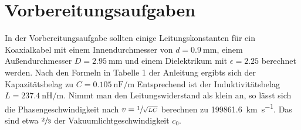 \section{Vorbereitungsaufgaben}
In der Vorbereitungsaufgabe sollten einige Leitungskonstanten für ein Koaxialkabel mit einem Innendurchmesser von $d = \SI{0.9}{\mm}$,
einem Außendurchmesser $D = \SI{2.95}{\mm}$  und einem Dielektrikum mit $\epsilon = \num{2.25}$ berechnet werden.
Nach den Formeln in Tabelle 1 der Anleitung\cite{v52} ergibts sich der Kapazitätsbelag zu $C = \SI{0.105}{\nano\farad \per \meter}$
Entsprechend ist der Induktivitätsbelag $ L = \SI{237.4}{\nano \henry \per \meter}$.
Nimmt man den Leitungswiderstand als klein an, so lässt sich die Phasengeschwindigkeit nach $v = \sfrac{1}{\sqrt{L C}}$ berechnen zu
\SI{199861.6}{\kilo\meter\per\second}. Das sind etwa $\sfrac{2}{3}$ der Vakuumlichtgeschwindigkeit $c_0$.
